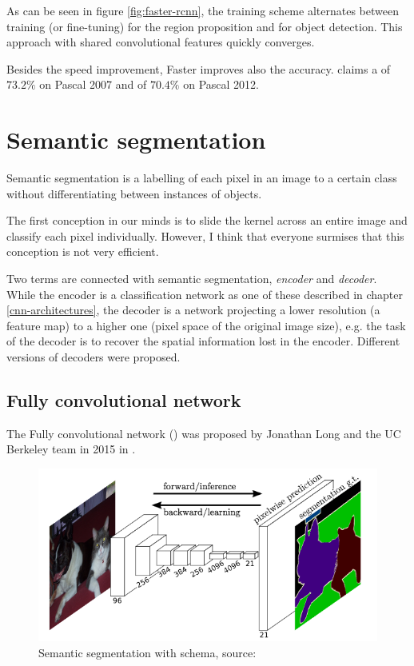 As can be seen in figure \ref{fig:faster-rcnn}, the training scheme alternates 
between training (or fine-tuning) for the region proposition and for object 
detection. This approach with shared convolutional features quickly converges.

Besides the speed improvement, Faster  improves also the accuracy. 
\cite{faster-rcnn} claims a  of $73.2 \%$ on Pascal  2007 and of 
$70.4 \%$ on Pascal  2012.


\section{Semantic segmentation}
\label{semantic-segmentation}

Semantic segmentation is a labelling of each pixel in an image to a certain 
class without differentiating between instances of objects.

The first conception in our minds is to slide the kernel across an entire image 
and classify each pixel individually. However, I think that everyone surmises 
that this conception is not very efficient.

Two terms are connected with semantic segmentation, \textit{encoder} and 
\textit{decoder}. While the encoder is a classification network as one of these 
described in chapter \ref{cnn-architectures}, the decoder is a network 
projecting a lower resolution (a feature map) to a higher one (pixel space of 
the original image size), e.g. the task of the decoder is to recover the spatial 
information lost in the encoder. Different versions of decoders were proposed.

\subsection{Fully convolutional network}
\label{fcns}

The Fully convolutional network () was proposed by Jonathan Long and the 
UC Berkeley team in 2015 in \cite{fcns}.

\begin{figure}[H]
   \centering
	\includegraphics[width=.8\linewidth]{./pictures/fcns.png}
	\caption[Fully convolutional network]{Semantic segmentation with  
schema, source: \cite{fcns}}
      \label{fig:fcns}
\end{figure}

